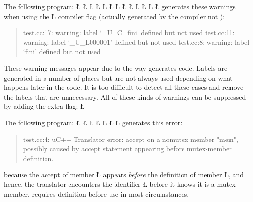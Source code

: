 \documentclass[openright,twoside]{report}
\begin{document}
The following program:
\LGinlinefalse\LGbegin\lgrinde
\L{}
\L{}
\L{\LB{}}
\L{}
\L{\LB{}}
\L{\LB{}}
\L{\LB{}}
\L{\LB{}}
\L{\LB{}}
\L{\LB{}}
\L{\LB{}}
\L{\LB{}}
\L{\LB{\};}}
\endlgrinde\LGend
generates these warnings when using the \LGinlinetrue\LGbegin\lgrinde\L{}\endlgrinde\LGend{} compiler flag (actually generated by the \CC compiler not \uC):
\begin{quote}
\BGfont
test.cc:17: warning: label `\_U\_C\_fini' defined but not used
\newline
test.cc:11: warning: label `\_U\_L000001' defined but not used
\newline
test.cc:8: warning: label `fini' defined but not used
\end{quote}
These warning messages appear due to the way \uC generates code.
Labels are generated in a number of places but are not always used depending on what happens later in the code.
It is too difficult to detect all these cases and remove the labels that are unnecessary.
All of these kinds of warnings can be suppressed by adding the extra flag:
\LGinlinefalse\LGbegin\lgrinde
\L{}
\endlgrinde\LGend

The following program:
\LGinlinefalse\LGbegin\lgrinde
\L{}
\L{\LB{}}
\L{\LB{}}
\L{\LB{}}
\L{}
\L{\LB{}}
\L{\LB{\};}}
\endlgrinde\LGend
generates this error:
\begin{quote}
\BGfont
test.cc:4: uC++ Translator error: accept on a nomutex member "mem", possibly caused by accept statement appearing before mutex-member definition.
\end{quote}
because the accept of member \LGinlinetrue\LGbegin\lgrinde\L{}\endlgrinde\LGend{} appears \emph{before} the definition of member \LGinlinetrue\LGbegin\lgrinde\L{}\endlgrinde\LGend{}, and hence, the \uC translator encounters the identifier \LGinlinetrue\LGbegin\lgrinde\L{}\endlgrinde\LGend{} before it knows it is a mutex member.
\CC requires definition before use in most circumstances.
\end{document}
